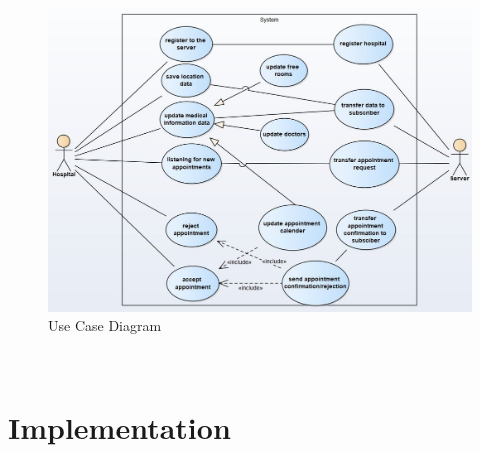 \begin{figure}[H]
\centering
\sidecaption
\includegraphics[scale=.425]{images/melanie_images/UseCase_Hospital-Search_variant-2.jpg}
\caption{Use Case Diagram}
\label{Use_Case}
\end{figure}


\\
\clearpage
\section{Implementation}
\label{sec:4}


